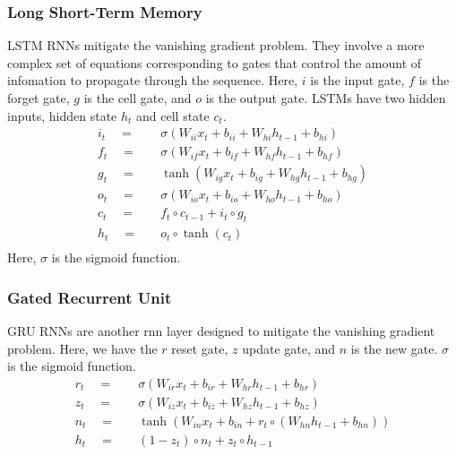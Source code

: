 \subsubsection{Long Short-Term Memory}
LSTM RNNs mitigate the vanishing gradient problem. They involve a more complex
set of equations corresponding to gates that control the amount of infomation
to propagate through the sequence. Here, $i$ is the input gate, $f$ is the
forget gate, $g$ is the cell gate, and $o$ is the output gate. LSTMs have
two hidden inputs, hidden state $h_t$ and cell state $c_t$.
\begin{equation}
  \begin{split}
    i_t \quad =& \quad \sigma \left( W_{ii} x_t + b_{ii} + W_{hi} h_{t-1} + b_{hi} \right) \\
    f_t \quad =& \quad \sigma \left( W_{if} x_t + b_{if} + W_{hf} h_{t-1} + b_{hf} \right) \\
    g_t \quad =& \quad \tanh \left( W_{ig} x_t + b_{ig} + W_{hg} h_{t-1} + b_{hg} \right) \\
    o_t \quad =& \quad \sigma \left( W_{io} x_t + b_{io} + W_{ho} h_{t-1} + b_{ho} \right) \\
    c_t \quad =& \quad f_t \circ c_{t-1} + i_t \circ g_t \\
    h_t \quad =& \quad o_t \circ \tanh \left( c_t \right) \\
  \end{split}
\end{equation}
Here, $\sigma$ is the sigmoid function.
\subsubsection{Gated Recurrent Unit}
GRU RNNs are another rnn layer designed to mitigate the vanishing gradient
problem. Here, we have the $r$ reset gate, $z$ update gate, and $n$ is the
new gate. $\sigma$ is the sigmoid function.
\begin{equation}
  \begin{split}
    r_t \quad =& \quad \sigma \left( W_{ir} x_t + b_{ir} + W_{hr} h_{t-1} + b_{hr} \right) \\
    z_t \quad =& \quad \sigma \left( W_{iz} x_t + b_{iz} + W_{hz} h_{t-1} + b_{hz} \right) \\
    n_t \quad =& \quad \tanh \left( W_{in} x_t + b_{in} + r_t \circ \left( W_{hn} h_{t-1} + b_{hn} \right) \right) \\
    h_t \quad =& \quad \left(1-z_t\right) \circ n_t + z_t \circ h_{t-1} \\
  \end{split}
\end{equation}
